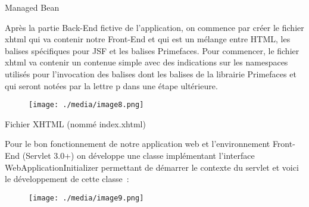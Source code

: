 \documentclass[12pt]{article}
\begin{document}

\par

\begin{Center}
Managed Bean
\end{Center}\par

Après la partie Back-End fictive de l’application, on commence par créer le fichier xhtml qui va contenir notre Front-End et qui est un mélange entre HTML, les balises spécifiques pour JSF et les balises Primefaces. Pour commencer, le fichier xhtml va contenir un contenue simple avec des indications sur les namespaces utilisés pour l’invocation des balises dont les balises de la librairie Primefaces et qui seront notées par la lettre p dans une étape ultérieure.\par




\begin{figure}[H]
	\begin{Center}
		\texttt{[image: ./media/image8.png]}
	\end{Center}
\end{figure}



\par

\begin{Center}
Fichier XHTML (nommé index.xhtml)
\end{Center}\par

Pour le bon fonctionnement de notre application web et l’environnement Front-End (Servlet 3.0+) on développe une classe implémentant l'interface WebApplicationInitializer permettant de démarrer le contexte du servlet et voici le développement de cette classe :\par




\begin{figure}[H]
	\begin{Center}
		\texttt{[image: ./media/image9.png]}
	\end{Center}
\end{figure}
\end{document}
